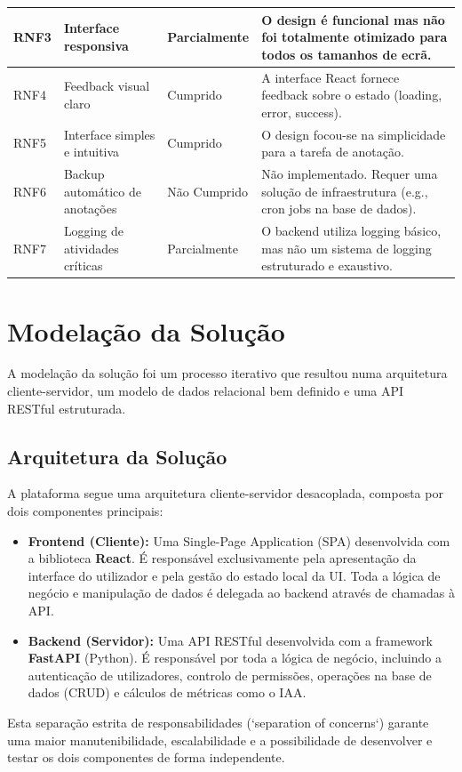 \begin{longtable}{|p{}|p{}|p{}|p{}|}
    \hline
    RNF3 & Interface responsiva & Parcialmente & O design é funcional mas não foi totalmente otimizado para todos os tamanhos de ecrã. \\
    \hline
    RNF4 & Feedback visual claro & Cumprido & A interface React fornece feedback sobre o estado (loading, error, success). \\
    \hline
    RNF5 & Interface simples e intuitiva & Cumprido & O design focou-se na simplicidade para a tarefa de anotação. \\
    \hline
    RNF6 & Backup automático de anotações & Não Cumprido & Não implementado. Requer uma solução de infraestrutura (e.g., cron jobs na base de dados). \\
    \hline
    RNF7 & Logging de atividades críticas & Parcialmente & O backend utiliza logging básico, mas não um sistema de logging estruturado e exaustivo. \\
    \hline
\end{longtable}

\section{Modelação da Solução}

A modelação da solução foi um processo iterativo que resultou numa arquitetura cliente-servidor, um modelo de dados relacional bem definido e uma API RESTful estruturada.

\subsection{Arquitetura da Solução}

A plataforma segue uma arquitetura cliente-servidor desacoplada, composta por dois componentes principais:

\begin{itemize}
    \item \textbf{Frontend (Cliente):} Uma Single-Page Application (SPA) desenvolvida com a biblioteca \textbf{React}. É responsável exclusivamente pela apresentação da interface do utilizador e pela gestão do estado local da UI. Toda a lógica de negócio e manipulação de dados é delegada ao backend através de chamadas à API.
    \item \textbf{Backend (Servidor):} Uma API RESTful desenvolvida com a framework \textbf{FastAPI} (Python). É responsável por toda a lógica de negócio, incluindo a autenticação de utilizadores, controlo de permissões, operações na base de dados (CRUD) e cálculos de métricas como o IAA.
\end{itemize}
Esta separação estrita de responsabilidades (`separation of concerns`) garante uma maior manutenibilidade, escalabilidade e a possibilidade de desenvolver e testar os dois componentes de forma independente.

